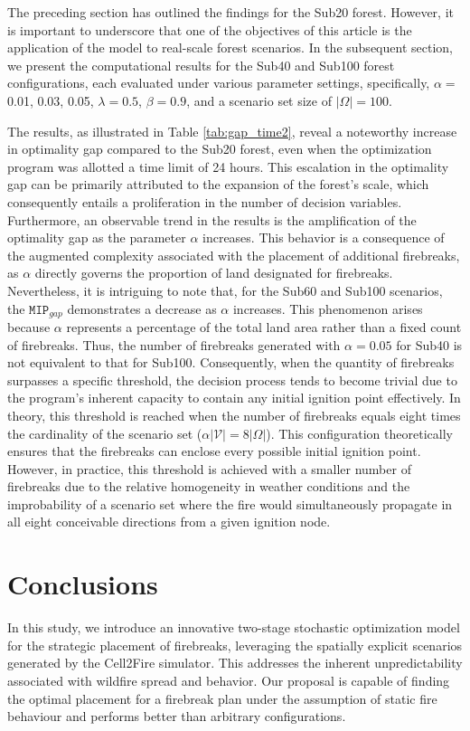 \documentclass[a4paper,fleqn]{cas-sc}
\begin{document}
The preceding section has outlined the findings for the Sub20 forest. However, it is important to underscore that one of the objectives of this article is the application of the model to real-scale forest scenarios. In the subsequent section, we present the computational results for the Sub40 and Sub100 forest configurations, each evaluated under various parameter settings, specifically, $\alpha =$ {0.01, 0.03, 0.05}, $\lambda = 0.5$, $\beta = 0.9$, and a scenario set size of $|\Omega| = 100$.



The results, as illustrated in Table \ref{tab:gap_time2}, reveal a noteworthy increase in optimality gap compared to the Sub20 forest, even when the optimization program was allotted a time limit of 24 hours. This escalation in the optimality gap can be primarily attributed to the expansion of the forest's scale, which consequently entails a proliferation in the number of decision variables.
Furthermore, an observable trend in the results is the amplification of the optimality gap as the parameter $\alpha$ increases. This behavior is a consequence of the augmented complexity associated with the placement of additional firebreaks, as $\alpha$ directly governs the proportion of land designated for firebreaks.
Nevertheless, it is intriguing to note that, for the Sub60 and Sub100 scenarios, the $\texttt{MIP}_{gap}$ demonstrates a decrease as $\alpha$ increases. This phenomenon arises because $\alpha$ represents a percentage of the total land area rather than a fixed count of firebreaks. Thus, the number of firebreaks generated with $\alpha = 0.05$ for Sub40 is not equivalent to that for Sub100. Consequently, when the quantity of firebreaks surpasses a specific threshold, the decision process tends to become trivial due to the program's inherent capacity to contain any initial ignition point effectively.
In theory, this threshold is reached when the number of firebreaks equals eight times the cardinality of the scenario set ($\alpha \lvert \mathcal{V} \vert = 8|\Omega|$). This configuration theoretically ensures that the firebreaks can enclose every possible initial ignition point. However, in practice, this threshold is achieved with a smaller number of firebreaks due to the relative homogeneity in weather conditions and the improbability of a scenario set where the fire would simultaneously propagate in all eight conceivable directions from a given ignition node.


\section{Conclusions}\label{Sec:conclusions}
In this study, we introduce an innovative two-stage stochastic optimization model for the strategic placement of firebreaks, leveraging the spatially explicit scenarios generated by the Cell2Fire simulator. This addresses the inherent unpredictability associated with wildfire spread and behavior. Our proposal is capable of finding the optimal placement for a firebreak plan under the assumption of static fire behaviour and performs better than arbitrary configurations.
\end{document}
